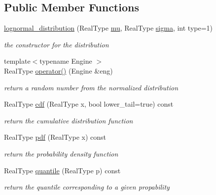 \subsection*{Public Member Functions}
\begin{DoxyCompactItemize}
\item 
\mbox{\hyperlink{structlognormal__distribution_a42052d18c13c0450b81c1687a210489b}{lognormal\+\_\+distribution}} (Real\+Type \mbox{\hyperlink{structlognormal__distribution_aafbea1099645b17baf5a6789e9a17615}{mu}}, Real\+Type \mbox{\hyperlink{structlognormal__distribution_a07a77c8819313d92d38a275ba1c94b55}{sigma}}, int type=1)
\begin{DoxyCompactList}\small\item\em the constructor for the distribution \end{DoxyCompactList}\item 
\mbox{\label{structlognormal__distribution_ad8a1fe52287436f6abd5ce60d91bad2c}} 
{\footnotesize template$<$typename Engine $>$ }\\Real\+Type \mbox{\hyperlink{structlognormal__distribution_ad8a1fe52287436f6abd5ce60d91bad2c}{operator()}} (Engine \&eng)
\begin{DoxyCompactList}\small\item\em return a random number from the normalized distribution \end{DoxyCompactList}\item 
Real\+Type \mbox{\hyperlink{structlognormal__distribution_a70784d5a2f900ab772c106e6990f176a}{cdf}} (Real\+Type x, bool lower\+\_\+tail=true) const
\begin{DoxyCompactList}\small\item\em return the cumulative distribution function \end{DoxyCompactList}\item 
Real\+Type \mbox{\hyperlink{structlognormal__distribution_a0bf3bc670b041d5015d9a4a88d6220a4}{pdf}} (Real\+Type x) const
\begin{DoxyCompactList}\small\item\em return the probability density function \end{DoxyCompactList}\item 
Real\+Type \mbox{\hyperlink{structlognormal__distribution_ae4e4b312d8225523a204f7e12615b8a2}{quantile}} (Real\+Type p) const
\begin{DoxyCompactList}\small\item\em return the quantile corresponding to a given propability \end{DoxyCompactList}\item 

\end{DoxyCompactItemize}
